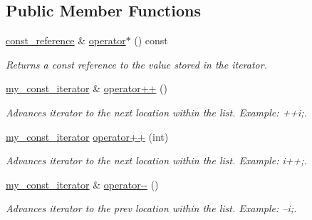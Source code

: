 \subsection*{Public Member Functions}
\begin{DoxyCompactItemize}
\item 
\mbox{\label{classls_1_1my__const__iterator_a2465f5fcba843f6f65729e3d181b04f8}} 
\hyperlink{classls_1_1my__const__iterator_a47552bc9ef18669651047b1741c7ed42}{const\+\_\+reference} \& \hyperlink{classls_1_1my__const__iterator_a2465f5fcba843f6f65729e3d181b04f8}{operator$\ast$} () const
\begin{DoxyCompactList}\small\item\em Returns a const reference to the value stored in the iterator. \end{DoxyCompactList}\item 
\mbox{\label{classls_1_1my__const__iterator_af058227856ecbcad2fe686a552ff2aec}} 
\hyperlink{classls_1_1my__const__iterator}{my\+\_\+const\+\_\+iterator} \& \hyperlink{classls_1_1my__const__iterator_af058227856ecbcad2fe686a552ff2aec}{operator++} ()
\begin{DoxyCompactList}\small\item\em Advances iterator to the next location within the list. Example\+: ++i;. \end{DoxyCompactList}\item 
\mbox{\label{classls_1_1my__const__iterator_a13a2d927db55c7571ee2a6c835dc208b}} 
\hyperlink{classls_1_1my__const__iterator}{my\+\_\+const\+\_\+iterator} \hyperlink{classls_1_1my__const__iterator_a13a2d927db55c7571ee2a6c835dc208b}{operator++} (int)
\begin{DoxyCompactList}\small\item\em Advances iterator to the next location within the list. Example\+: i++;. \end{DoxyCompactList}\item 
\mbox{\label{classls_1_1my__const__iterator_a44b566c18e94090b66101f604c17878e}} 
\hyperlink{classls_1_1my__const__iterator}{my\+\_\+const\+\_\+iterator} \& \hyperlink{classls_1_1my__const__iterator_a44b566c18e94090b66101f604c17878e}{operator-\/-\/} ()
\begin{DoxyCompactList}\small\item\em Advances iterator to the prev location within the list. Example\+: --i;. \end{DoxyCompactList}\item 

\end{DoxyCompactItemize}
